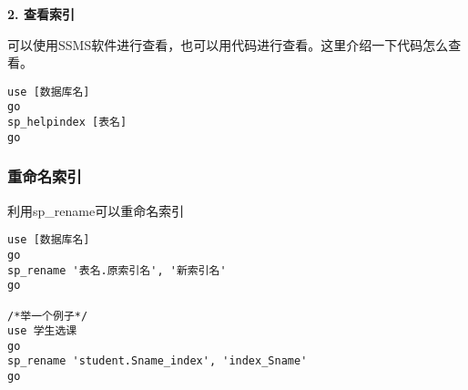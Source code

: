 \vspace{6pt}

\textbf{2. 查看索引}

\qquad 可以使用SSMS软件进行查看，也可以用代码进行查看。这里介绍一下代码怎么查看。

\begin{mdframed}[backgroundcolor=gray!10]
\begin{verbatim}
use [数据库名]
go
sp_helpindex [表名]
go
\end{verbatim}
\end{mdframed}

\subsubsection{重命名索引}

\qquad 利用sp\_rename可以重命名索引

\begin{mdframed}[backgroundcolor=gray!10]
\begin{verbatim}
use [数据库名]
go
sp_rename '表名.原索引名', '新索引名'
go

/*举一个例子*/
use 学生选课
go
sp_rename 'student.Sname_index', 'index_Sname'
go
\end{verbatim}
\end{mdframed}